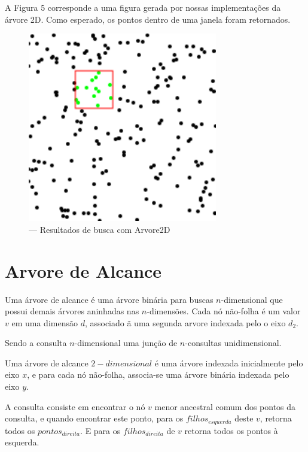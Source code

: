 A Figura 5 corresponde a uma figura gerada por nossas implementações da árvore 2D. Como esperado, os
pontos dentro de uma janela foram retornados.
\begin{figure}[H]
    \caption{\label{fig:Fig_5} — Resultados de busca com Arvore2D}
    \begin{center}
        \includegraphics{images/points.pdf}
    \end{center}
\end{figure}
\clearpage



\section{Arvore de Alcance}

Uma árvore de alcance é uma árvore binária para buscas $n$-dimensional que possui demais árvores aninhadas
nas $n$-dimensões.
Cada nó não-folha é um valor $v$ em uma dimensão $d$, associado ã uma segunda arvore indexada pelo o 
eixo $d_2$.

Sendo a consulta $n$-dimensional uma junção de $n$-consultas unidimensional.

Uma árvore de alcance $2-dimensional$ é uma árvore indexada inicialmente pelo eixo $x$, e para cada
nó não-folha, associa-se uma árvore binária indexada pelo eixo $y$.

A consulta consiste em encontrar o nó $v$ menor ancestral comum dos pontos da consulta, e quando encontrar este
ponto, para os $filhos_{esquerda}$ deste $v$, retorna todos os $pontos_{direita}$. E para os $filhos_{direita}$
de $v$ retorna todos os pontos à esquerda.

